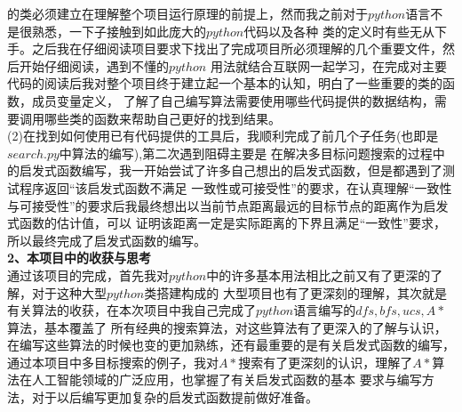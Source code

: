 \documentclass[a4paper,12pt,UTF8]{article}
\begin{document}
\begin{flushleft}
{{        的类必须建立在理解整个项目运行原理的前提上，然而我之前对于$python$语言不是很熟悉，一下子接触到如此庞大的$python$代码以及各种
        类的定义时有些无从下手。之后我在仔细阅读项目要求下找出了完成项目所必须理解的几个重要文件，然后开始仔细阅读，遇到不懂的$python$
        用法就结合互联网一起学习，在完成对主要代码的阅读后我对整个项目终于建立起一个基本的认知，明白了一些重要的类的函数，成员变量定义，
        了解了自己编写算法需要使用哪些代码提供的数据结构，需要调用哪些类的函数来帮助自己更好的找到结果。\\
        \hspace{1cm}(2)在找到如何使用已有代码提供的工具后，我顺利完成了前几个子任务(也即是$search.py$中算法的编写),第二次遇到阻碍主要是
        在解决多目标问题搜索的过程中的启发式函数编写，我一开始尝试了许多自己想出的启发式函数，但是都遇到了测试程序返回“该启发式函数不满足
        一致性或可接受性”的要求，在认真理解“一致性与可接受性”的要求后我最终想出以当前节点距离最远的目标节点的距离作为启发式函数的估计值，可以
        证明该距离一定是实际距离的下界且满足“一致性”要求，所以最终完成了启发式函数的编写。\\
    }
    \large{
        \textbf{
            2、本项目中的收获与思考\\
        }
    }
    \normalsize{
        \hspace{1cm}通过该项目的完成，首先我对$python$中的许多基本用法相比之前又有了更深的了解，对于这种大型$python$类搭建构成的
        大型项目也有了更深刻的理解，其次就是有关算法的收获，在本次项目中我自己完成了$python$语言编写的$dfs,bfs,ucs,A*$算法，基本覆盖了
        所有经典的搜索算法，对这些算法有了更深入的了解与认识，在编写这些算法的时候也变的更加熟练，还有最重要的是有关启发式函数的编写，
        通过本项目中多目标搜索的例子，我对$A*$搜索有了更深刻的认识，理解了$A*$算法在人工智能领域的广泛应用，也掌握了有关启发式函数的基本
        要求与编写方法，对于以后编写更加复杂的启发式函数提前做好准备。\\
    }
}
\end{flushleft}
\end{document}
